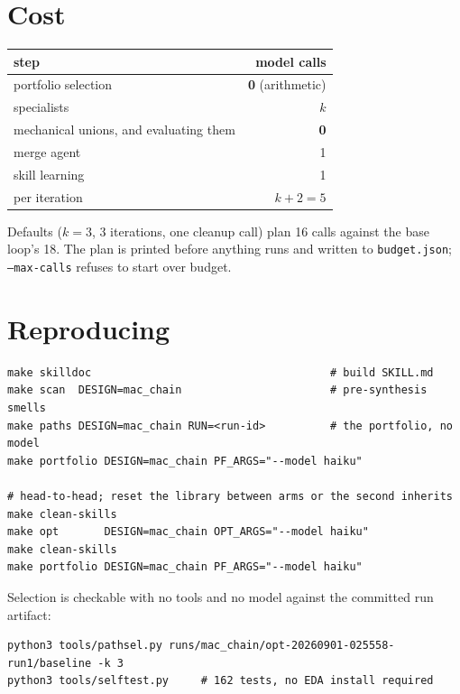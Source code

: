 \documentclass[11pt,a4paper]{article}
\begin{document}
\section{Cost}

\begin{center}
\begin{tabular}{@{}lr@{}}
\toprule
step & model calls \\
\midrule
portfolio selection & \textbf{0} (arithmetic) \\
specialists & $k$ \\
mechanical unions, and evaluating them & \textbf{0} \\
merge agent & 1 \\
skill learning & 1 \\
\midrule
per iteration & $k+2 = 5$ \\
\bottomrule
\end{tabular}
\end{center}

\noindent
Defaults ($k=3$, 3 iterations, one cleanup call) plan 16 calls against the base
loop's 18. The plan is printed before anything runs and written to
\texttt{budget.json}; \texttt{--max-calls} refuses to start over budget.

\section{Reproducing}

\begin{lstlisting}
make skilldoc                                     # build SKILL.md
make scan  DESIGN=mac_chain                       # pre-synthesis smells
make paths DESIGN=mac_chain RUN=<run-id>          # the portfolio, no model
make portfolio DESIGN=mac_chain PF_ARGS="--model haiku"

# head-to-head; reset the library between arms or the second inherits
make clean-skills
make opt       DESIGN=mac_chain OPT_ARGS="--model haiku"
make clean-skills
make portfolio DESIGN=mac_chain PF_ARGS="--model haiku"
\end{lstlisting}

\noindent
Selection is checkable with no tools and no model against the committed run
artifact:

\begin{lstlisting}
python3 tools/pathsel.py runs/mac_chain/opt-20260901-025558-run1/baseline -k 3
python3 tools/selftest.py     # 162 tests, no EDA install required
\end{lstlisting}
\end{document}
